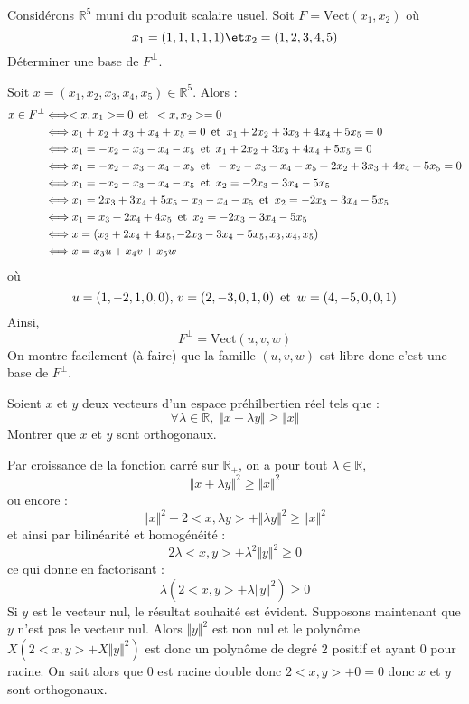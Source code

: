 \documentclass[a4paper,10pt]{report}
\begin{document}
\begin{Exercice}{} Considérons $\mathbb{R}^5$ muni du produit scalaire usuel. Soit $F= \textrm{Vect}(x_1,x_2)$ où
$$ x_1 = (1,1,1,1,1) \et x_2 = (1,2,3,4,5)$$
Déterminer une base de $F^{\perp}$.
\end{Exercice} 

\corr Soit $x= (x_1,x_2,x_3,x_4,x_5) \in \mathbb{R}^5$. Alors :
\begin{align*}
x \in F^{\perp} & \Longleftrightarrow <x,x_1>=0 \, \hbox{ et } \,  <x,x_2>=0 \\
& \Longleftrightarrow x_1+x_2+x_3+x_4+x_5=0 \, \hbox{ et } \, x_1+2x_2+3x_3+4x_4+5x_5=0 \\
& \Longleftrightarrow x_1=-x_2-x_3-x_4-x_5 \, \hbox{ et } \, x_1+2x_2+3x_3+4x_4+5x_5=0 \\
& \Longleftrightarrow x_1=-x_2-x_3-x_4-x_5 \, \hbox{ et } \, -x_2-x_3-x_4-x_5+2x_2+3x_3+4x_4+5x_5=0 \\
&  \Longleftrightarrow x_1=-x_2-x_3-x_4-x_5 \, \hbox{ et } \, x_2=-2x_3-3x_4-5x_5 \\
&  \Longleftrightarrow x_1=2x_3+3x_4+5x_5-x_3-x_4-x_5 \, \hbox{ et } \, x_2=-2x_3-3x_4-5x_5 \\
&  \Longleftrightarrow x_1=x_3+2x_4+4x_5 \, \hbox{ et } \, x_2=-2x_3-3x_4-5x_5 \\
& \Longleftrightarrow x= (x_3+2x_4+4x_5, -2x_3-3x_4-5x_5,x_3,x_4,x_5) \\
& \Longleftrightarrow x= x_3 u+x_4 v+ x_5w
\end{align*}
où
$$ u=(1,-2,1,0,0), \, v =(2,-3,0,1,0) \, \hbox{ et } \, w=(4,-5,0,0,1)$$
Ainsi,
$$ F^{\perp} = \textrm{Vect}(u,v,w)$$
On montre facilement (à faire) que la famille $(u,v,w)$ est libre donc c'est une base de $F^{\perp}$.

\begin{Exercice}{} Soient $x$ et $y$ deux vecteurs d'un espace préhilbertien réel tels que :
$$ \forall \lambda \in \mathbb{R}, \; \Vert x+\lambda y \Vert \geq \Vert x \Vert$$
Montrer que $x$ et $y$ sont orthogonaux.
\end{Exercice}

\corr Par croissance de la fonction carré sur $\mathbb{R}_{+}$, on a pour tout $\lambda \in \mathbb{R}$,
$$ \Vert x+\lambda y \Vert^2 \geq \Vert x \Vert^2$$
ou encore :
$$ \Vert x \Vert^2 + 2  <x,\lambda y> + \Vert \lambda y \Vert^2 \geq \Vert x \Vert^2$$
et ainsi par bilinéarité et homogénéité :
$$ 2 \lambda <x,y> + \lambda^2 \Vert y \Vert^2 \geq 0$$
ce qui donne en factorisant :
$$ \lambda (2<x,y> + \lambda \Vert y \Vert^2) \geq 0$$
Si $y$ est le vecteur nul, le résultat souhaité est évident. Supposons maintenant que $y$ n'est pas le vecteur nul. Alors $\Vert y \Vert^2$ est non nul et le polynôme $X(2<x,y>+ X \Vert y \Vert^2)$ est donc un polynôme de degré $2$ positif et ayant $0$ pour racine. On sait alors que $0$ est racine double donc $2<x,y>+0=0$ donc $x$ et $y$ sont orthogonaux.
\end{document}

